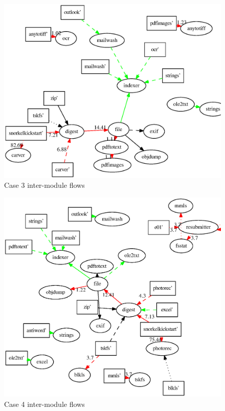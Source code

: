 \begin{figure}
  \centering
  \includegraphics[width=130mm]{ocfa/step5/stripped3_modules.eps}
  \caption{Case 3 inter-module flows}
  \label{fig:Case3Modules}
\end{figure}
\begin{figure}
  \centering
  \includegraphics[width=130mm]{ocfa/step5/stripped4_modules.eps}
  \caption{Case 4 inter-module flows}
  \label{fig:Case4Modules}
\end{figure}
